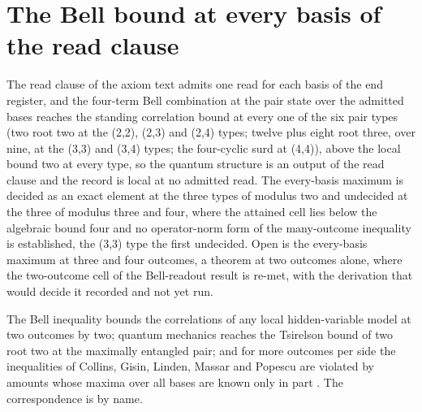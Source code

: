 \section{The Bell bound at every basis of the read clause}\label{mod:II-1-D535335-w-ebrc}
\begin{chwall}\label{box:II-1-D535335-w-ebrc:1}
The read clause of the axiom text admits one read for each basis of the end register, and the four-term Bell combination at the pair state over the admitted bases reaches the standing correlation bound at every one of the six pair types (two root two at the (2,2), (2,3) and (2,4) types; twelve plus eight root three, over nine, at the (3,3) and (3,4) types; the four-cyclic surd at (4,4)), above the local bound two at every type, so the quantum structure is an output of the read clause and the record is local at no admitted read. The every-basis maximum is decided as an exact element at the three types of modulus two and undecided at the three of modulus three and four, where the attained cell lies below the algebraic bound four and no operator-norm form of the many-outcome inequality is established, the (3,3) type the first undecided.
Open is the every-basis maximum at three and four outcomes, a theorem at two outcomes alone, where the two-outcome cell of the Bell-readout result is re-met, with the derivation that would decide it recorded and not yet run.
\end{chwall}
\begin{chbridge}
The Bell inequality bounds the correlations of any local hidden-variable model at two outcomes by two; quantum mechanics reaches the Tsirelson bound of two root two at the maximally entangled pair; and for more outcomes per side the inequalities of Collins, Gisin, Linden, Massar and Popescu are violated by amounts whose maxima over all bases are known only in part \cite{Bell1964,Tsirelson1980,CGLMP2002}. The correspondence is by name.
\end{chbridge}
